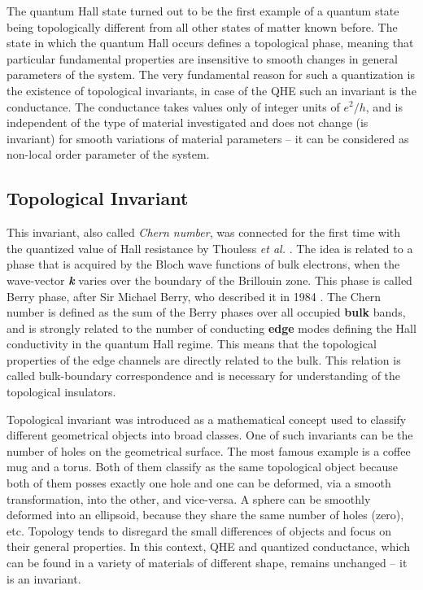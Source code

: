 \documentclass[titlepage,a4paper]{book}
\newcommand{\wciecie}{\quad\phantom{v}}
\begin{document}
The quantum Hall state turned out to be the first example of a quantum state being topologically different from all other states of matter known before. The state in which the quantum Hall occurs defines a topological phase, meaning that particular fundamental properties are insensitive to smooth changes in general parameters of the system. The very fundamental reason for such a quantization is the existence of topological invariants, in case of the QHE such an invariant is the conductance. The conductance takes values only of integer units of $e^2/h$, and is independent of the type of material investigated and does not change (is invariant) for smooth variations of material parameters – it can be considered as non-local order parameter of the system.  

\subsection{Topological Invariant}
\wciecie
This invariant, also called \textit{Chern number}, was connected for the first time with the quantized value of Hall resistance by Thouless \textit{et al.} \cite{Thouless_Topology}. The idea is related to a phase that is acquired by the Bloch wave functions of bulk electrons, when the wave-vector \textbf{\textit{k}} varies over the boundary of the Brillouin zone. This phase is called Berry phase, after Sir Michael Berry, who described it in 1984 \cite{Berry_phase}. The Chern number is defined as the sum of the Berry phases over all occupied \textbf{bulk} bands, and is strongly related to the number of conducting \textbf{edge} modes defining the Hall conductivity in the quantum Hall regime. This means that the topological properties of the edge channels are directly related to the bulk. This relation is called bulk-boundary correspondence and is necessary for understanding of the topological insulators.

Topological invariant was introduced as a mathematical concept used to classify different geometrical objects into broad classes. One of such invariants can be the number of holes on the geometrical surface. The most famous example is a coffee mug and a torus. Both of them classify as the same topological object because both of them posses exactly one hole and one can be deformed, via a smooth transformation, into the other, and vice-versa. A sphere can be smoothly deformed into an ellipsoid, because they share the same number of holes (zero), etc. Topology tends to disregard the small differences of objects and focus on their general properties. In this context, QHE and quantized conductance, which can be found in a variety of materials of different shape, remains unchanged -- it is an invariant. 
 
\end{document}
